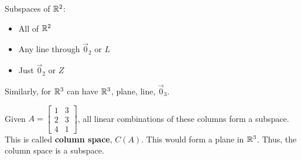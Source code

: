 Subspaces of $\mathbb{R}^2$:
\begin{itemize}
    \item All of $\mathbb{R}^2$
    \item Any line through $\vec{0}_2$ or $L$
    \item Just $\vec{0}_2$ or $Z$
\end{itemize}

Similarly, for $\mathbb{R}^3$ can have $\mathbb{R}^3$, plane, line, $\vec{0}_3$.\newline

Given $A=\left[\begin{array}{ll}
    1 & 3 \\
    2 & 3 \\
    4 & 1\end{array}\right]$, all linear combinations of these columns form a subspace. 
This is called \textbf{column space}, $C(A)$. This would form a plane in $\mathbb{R}^3$. Thus, the column space is a subspace.